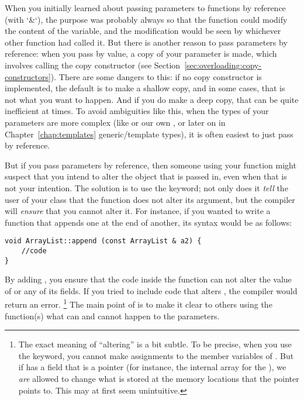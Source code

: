 When you initially learned about passing parameters to functions by
reference (with `\&`), the purpose was probably always so that the
function could modify the content of the variable,
and the modification would be seen by whichever other function had called it.
But there is another reason to pass parameters by reference: 
when you pass by value, a copy of your parameter is made,
which involves calling the copy constructor 
(see Section~\ref{sec:overloading:copy-constructors}).
There are some dangers to this:
if no copy constructor is implemented, the default is to make a shallow copy,
and in some cases, that is not what you want to happen. 
And if you do make a deep copy, that can be quite inefficient at times.
To avoid ambiguities like this,
when the types of your parameters are more complex
(like  or our own , or later on in
Chapter~\ref{chap:templates} generic/template types),
it is often easiest to just pass by reference.

But if you pass parameters by reference,
then someone using your function might suspect that you intend to
alter the object that is passed in, 
even when that is not your intention. 
The solution is to use the  keyword;
not only does it \emph{tell} the user of your class that the function
does not alter its argument,
but the compiler will \emph{ensure} that you cannot alter it. 
For instance, if you wanted to write a function  that
appends one  at the end of another,
its syntax would be as follows:

\begin{verbatim}
void ArrayList::append (const ArrayList & a2) {
    //code
}
\end{verbatim}
By adding , you ensure that the code inside the function
can not alter the value of  or any of its fields. 
If you tried to include code that alters ,
the compiler would return an error.%
\footnote{The exact meaning of ``altering''  is a bit subtle.
  To be precise, when you use the  keyword,
  you cannot make assignments to the member variables of .
  But if  has a field that is a pointer
  (for instance, the internal array for the ),
  we \emph{are} allowed to change what is stored at the memory
  locations that the pointer points to.
  This may at first seem unintuitive.}
The main point of  is to make it clear to others using the
function(s) what can and cannot happen to the parameters.

